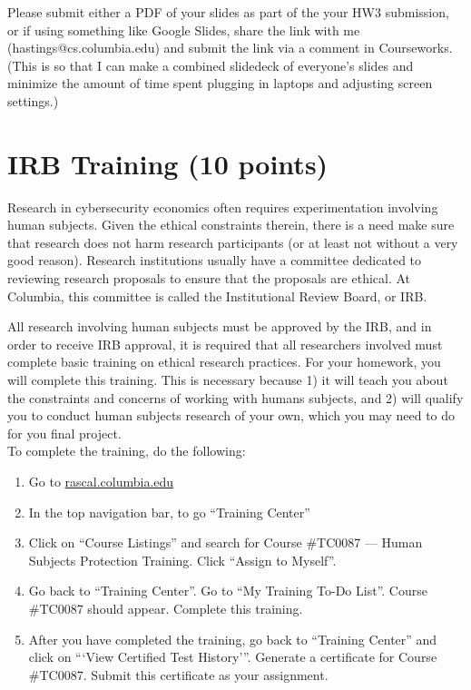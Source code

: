 \documentclass[11pt]{article}
\begin{document}
\noindent Please submit either a PDF of your slides as part of the your HW3 submission, or if using something like Google Slides, share the link with me (hastings@cs.columbia.edu) and submit the link via a comment in Courseworks. (This is so that I can make a combined slidedeck of everyone's slides and minimize the amount of time spent plugging in laptops and adjusting screen settings.)




\section*{IRB Training (10 points)}

Research in cybersecurity economics often requires experimentation involving human subjects. Given the ethical constraints therein, there is a need make sure that research does not harm research participants (or at least not without a very good reason). Research institutions usually have a committee dedicated to reviewing research proposals to ensure that the proposals are ethical. At Columbia, this committee is called the Institutional Review Board, or IRB. 

All research involving human subjects must be approved by the IRB, and in order to receive IRB approval, it is required that all researchers involved must complete basic training on ethical research practices. For your homework, you will complete this training. This is necessary because 1) it will teach you about the constraints and concerns of working with humans subjects, and 2) will qualify you to conduct human subjects research of your own, which you may need to do for you final project.
\\

\noindent To complete the training, do the following:
\begin{enumerate}
    \item Go to \href{rascal.columbia.edu}{rascal.columbia.edu}
    \item In the top navigation bar, to go ``Training Center''
    \item Click on ``Course Listings'' and search for Course \#TC0087 --- Human Subjects Protection Training. Click ``Assign to Myself''.
    \item Go back to ``Training Center''. Go to ``My Training To-Do List''. Course \#TC0087 should appear. Complete this training.
    \item After you have completed the training, go back to ``Training Center'' and click on ```View Certified Test History'''. Generate a certificate for Course \#TC0087. Submit this certificate as your assignment.
\end{enumerate}
\end{document}
